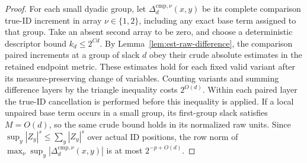 \begin{proof}
For each small dyadic group, let $\Delta_d^{\mathrm{cmp},\nu}(x,y)$ be
its complete comparison true-ID increment in array $\nu\in\{1,2\}$,
including any exact base term assigned to that group.  Take an absent second array
to be zero, and choose a deterministic descriptor bound $k_d\le2^{Cd}$.
By Lemma~\ref{lem:est-raw-difference}, the comparison paired increments at a
group of slack $d$ obey their crude absolute estimates in the retained
endpoint metric.  These estimates hold for each fixed valid variant
after its measure-preserving change of variables.  Counting variants
and summing difference layers by the triangle inequality costs
$2^{O(d)}$.  Within each paired layer
the true-ID cancellation is performed before this inequality is
applied.  If a local unpaired base term occurs in a small group, its
first-group slack satisfies $M=O(d)$, so the same crude bound holds in
its normalized raw units.  Since $\sup_y|Z_y|^s\le\sum_y|Z_y|^s$ over actual ID
positions, the row norm of
$\max_\nu\sup_y|\Delta_d^{\mathrm{cmp},\nu}(x,y)|$ is at most
$2^{-p+O(d)}$.


\end{proof}
